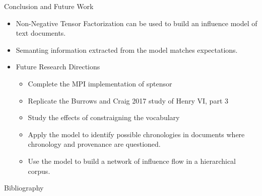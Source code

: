 \documentclass[handout]{beamer}
\begin{document}
\begin{frame}{Conclusion and Future Work}
  \begin{itemize}[<+->]
    \item Non-Negative Tensor Factorization can be used to build an
      influence model of text documents.
    \item Semanting information extracted from the model matches
      expectations.
    \item Future Research Directions
      \begin{itemize}
      \item Complete the MPI implementation of sptensor
      \item Replicate the Burrows and Craig 2017 study of Henry VI,
        part 3
      \item Study the effects of constraigning the vocabulary
      \item Apply the model to identify possible chronologies in
        documents where chronology and provenance are questioned.
      \item Use the model to build a network of influence flow in a
        hierarchical corpus.
      \end{itemize}
  \end{itemize}
\end{frame}

\begin{frame}[allowframebreaks]{Bibliography}
{}

\end{frame}
\end{document}
